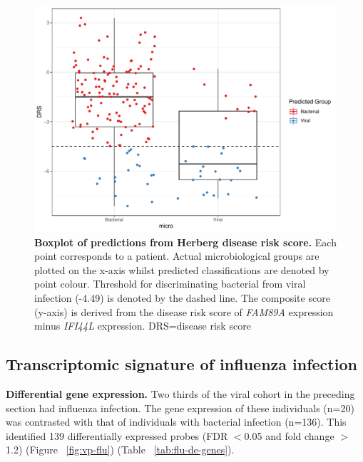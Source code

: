 \begin{figure}[htbp]
\centering
\includegraphics[scale=0.5]{./Results3/Images/Herberg-boxplot.pdf}
\caption[Boxplot for Herberg disease risk score]{\textbf{Boxplot of predictions from Herberg disease risk score.} Each point corresponds to a patient. Actual microbiological groups are plotted on the x-axis whilst predicted classifications are denoted by point colour. Threshold for discriminating bacterial from viral infection (-4.49) is denoted by the dashed line. The composite score (y-axis) is derived from the disease risk score of \textit{FAM89A} expression minus \textit{IFI44L} expression. DRS=disease risk score}
\label{fig:boxplot-herberg}
\end{figure}
\FloatBarrier

\subsection{Transcriptomic signature of influenza infection}
\textbf{Differential gene expression.} Two thirds of the viral cohort in the preceding section had influenza infection. The gene expression of these individuals (n=20) was contrasted with that of individuals with bacterial infection (n=136). This identified 139 differentially expressed probes (FDR $<$0.05 and fold change $>$1.2) (Figure ~\ref{fig:vp-flu}) (Table ~\ref{tab:flu-de-genes}).

